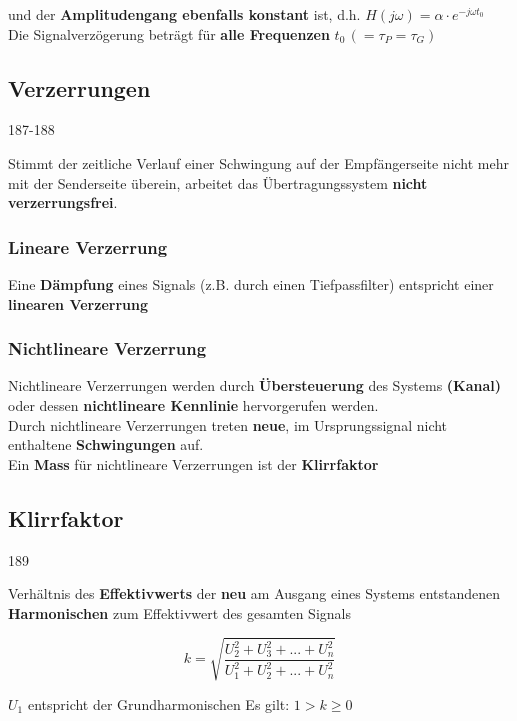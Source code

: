 und der \textbf{Amplitudengang ebenfalls konstant} ist, d.h. $H(j \omega) = \alpha \cdot e^{-j \omega t_0}$ \\
Die Signalverzögerung beträgt für \textbf{alle Frequenzen} $t_0 \, (= \tau_P = \tau_G) $ 


\subsection{Verzerrungen}{187-188}

Stimmt der zeitliche Verlauf einer Schwingung auf der Empfängerseite nicht mehr mit der Senderseite überein, arbeitet das
Übertragungssystem \textbf{nicht verzerrungsfrei}.


\subsubsection{Lineare Verzerrung}
Eine \textbf{Dämpfung} eines Signals (z.B. durch einen Tiefpassfilter) entspricht einer \textbf{linearen Verzerrung}


\subsubsection{Nichtlineare Verzerrung}
Nichtlineare Verzerrungen werden durch \textbf{Übersteuerung} des Systems \textbf{(Kanal)} oder dessen
\textbf{nichtlineare Kennlinie} hervorgerufen werden. \\
Durch nichtlineare Verzerrungen treten \textbf{neue}, im Ursprungssignal nicht enthaltene \textbf{Schwingungen} auf.\\
Ein \textbf{Mass} für nichtlineare Verzerrungen ist der \textbf{Klirrfaktor}


\subsection{Klirrfaktor}{189}

Verhältnis des \textbf{Effektivwerts} der \textbf{neu} am Ausgang eines Systems entstandenen \textbf{Harmonischen} zum 
Effektivwert des gesamten Signals

\begin{minipage}[c]{0.48\columnwidth}
    $$ \boxed{ k = \sqrt{\frac{U_2^2 + U_3^2 + ...+ U_n^2}{U_1^2 + U_2^2 + ...+ U_n^2}}} $$
\end{minipage}
\hfill
\begin{minipage}[c]{0.48\columnwidth}
    $U_1$ entspricht der Grundharmonischen
    \textrightarrow Es gilt: $1 > k \geq 0$
\end{minipage}


